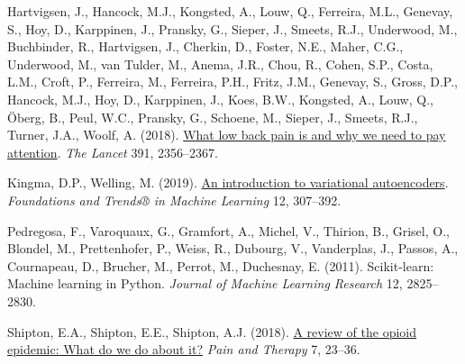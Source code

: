\documentclass[11pt]{article}
\begin{document}
\hypertarget{citeproc_bib_item_4}{Hartvigsen, J., Hancock, M.J., Kongsted, A., Louw, Q., Ferreira, M.L., Genevay, S., Hoy, D., Karppinen, J., Pransky, G., Sieper, J., Smeets, R.J., Underwood, M., Buchbinder, R., Hartvigsen, J., Cherkin, D., Foster, N.E., Maher, C.G., Underwood, M., van Tulder, M., Anema, J.R., Chou, R., Cohen, S.P., Costa, L.M., Croft, P., Ferreira, M., Ferreira, P.H., Fritz, J.M., Genevay, S., Gross, D.P., Hancock, M.J., Hoy, D., Karppinen, J., Koes, B.W., Kongsted, A., Louw, Q., Öberg, B., Peul, W.C., Pransky, G., Schoene, M., Sieper, J., Smeets, R.J., Turner, J.A., Woolf, A. (2018). \href{https://doi.org/https://doi.org/10.1016/S0140-6736(18)30480-X}{What low back pain is and why we need to pay attention}. \textit{The Lancet} 391, 2356–2367.}

\hypertarget{citeproc_bib_item_5}{Kingma, D.P., Welling, M. (2019). \href{https://doi.org/10.1561/2200000056}{An introduction to variational autoencoders}. \textit{Foundations and Trends® in Machine Learning} 12, 307–392.}

\hypertarget{citeproc_bib_item_6}{Pedregosa, F., Varoquaux, G., Gramfort, A., Michel, V., Thirion, B., Grisel, O., Blondel, M., Prettenhofer, P., Weiss, R., Dubourg, V., Vanderplas, J., Passos, A., Cournapeau, D., Brucher, M., Perrot, M., Duchesnay, E. (2011). Scikit-learn: Machine learning in Python. \textit{Journal of Machine Learning Research} 12, 2825–2830.}

\hypertarget{citeproc_bib_item_7}{Shipton, E.A., Shipton, E.E., Shipton, A.J. (2018). \href{https://doi.org/10.1007/s40122-018-0096-7}{A review of the opioid epidemic: What do we do about it?} \textit{Pain and Therapy} 7, 23–36.}
\end{document}
